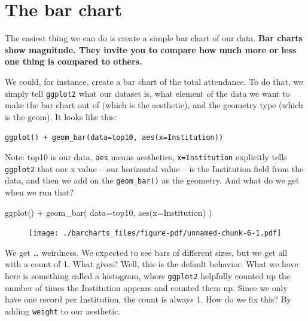 \documentclass[
  letterpaper,
  DIV=11,
  numbers=noendperiod]{scrreprt}
\newenvironment{Shaded}{\begin{snugshade}}{\end{snugshade}}
\newcommand{\AttributeTok}[1]{\textcolor[rgb]{0.40,0.45,0.13}{#1}}
\newcommand{\FunctionTok}[1]{\textcolor[rgb]{0.28,0.35,0.67}{#1}}
\newcommand{\NormalTok}[1]{\textcolor[rgb]{0.00,0.23,0.31}{#1}}
\newcommand{\SpecialCharTok}[1]{\textcolor[rgb]{0.37,0.37,0.37}{#1}}
\begin{document}
\hypertarget{the-bar-chart}{%
\section{The bar chart}\label{the-bar-chart}}

The easiest thing we can do is create a simple bar chart of our data.
\textbf{Bar charts show magnitude. They invite you to compare how much
more or less one thing is compared to others.}

We could, for instance, create a bar chart of the total attendance. To
do that, we simply tell \texttt{ggplot2} what our dataset is, what
element of the data we want to make the bar chart out of (which is the
aesthetic), and the geometry type (which is the geom). It looks like
this:

\texttt{ggplot()\ +\ geom\_bar(data=top10,\ aes(x=Institution))}

Note: top10 is our data, \texttt{aes} means aesthetics,
\texttt{x=Institution} explicitly tells \texttt{ggplot2} that our x
value -- our horizontal value -- is the Institution field from the data,
and then we add on the \texttt{geom\_bar()} as the geometry. And what do
we get when we run that?

\begin{Shaded}
\begin{Highlighting}[]
\FunctionTok{ggplot}\NormalTok{() }\SpecialCharTok{+} 
  \FunctionTok{geom\_bar}\NormalTok{(}
    \AttributeTok{data=}\NormalTok{top10, }
    \FunctionTok{aes}\NormalTok{(}\AttributeTok{x=}\NormalTok{Institution)}
\NormalTok{  )}
\end{Highlighting}
\end{Shaded}

\begin{figure}[H]

{\centering \texttt{[image: ./barcharts\_files/figure-pdf/unnamed-chunk-6-1.pdf]}

}

\end{figure}

We get \ldots{} weirdness. We expected to see bars of different sizes,
but we get all with a count of 1. What gives? Well, this is the default
behavior. What we have here is something called a histogram, where
\texttt{ggplot2} helpfully counted up the number of times the
Institution appears and counted them up. Since we only have one record
per Institution, the count is always 1. How do we fix this? By adding
\texttt{weight} to our aesthetic.
\end{document}
